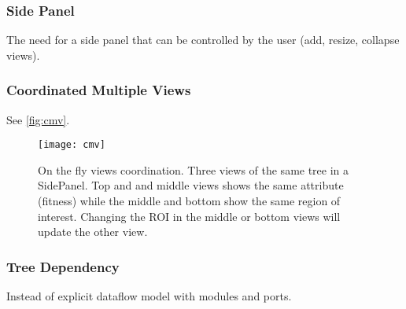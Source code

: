 \subsubsection{Side Panel}
\label{sec:sidepanel}
The need for a side panel that can be controlled by the user (add, resize, collapse views).

\subsubsection{Coordinated Multiple Views}
\label{sec:cmv}

See \autoref{fig:cmv}.

\begin{figure}[htb]
    \begin{center}
     \texttt{[image: cmv]}
    \caption{On the fly views coordination. Three views of the same tree in a SidePanel. Top and and middle views shows the same attribute (fitness) while the middle and bottom show the same region of interest. Changing the ROI in the middle or bottom views will update the other view.} 
    \label{fig:cmv}
    \end{center}
\end{figure}

\subsubsection{Tree Dependency}
\label{sec:tree-dependency}

Instead of explicit dataflow model with modules and ports.
